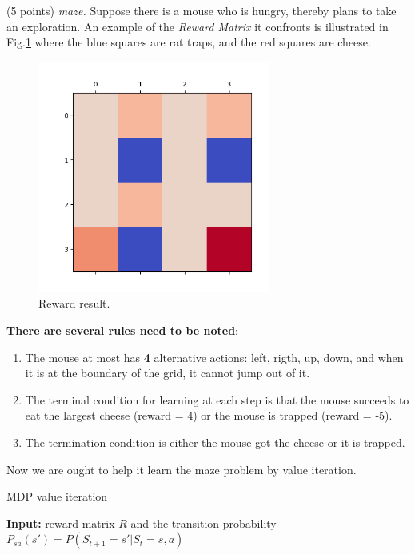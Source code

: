 \documentclass[a4paper, 12pt]{exam}
\begin{document}
	\begin{questions}
		\question (5 points) \emph{maze.} Suppose there is a mouse who is hungry, thereby plans to take an exploration. An example of the \emph{Reward Matrix} it confronts is illustrated in Fig.\ref{fig1} where the blue squares are rat traps, and the red squares are cheese. 
	\begin{figure}[htbp]
\centering
\includegraphics[width=3in]{0.png}
\caption{Reward result.}\label{fig1}
\end{figure}
 \textbf{There are several rules need to be noted}:
\begin{enumerate}[label=\roman*.]
\item The mouse at most has \textbf{4} alternative actions: left, rigth, up, down, and when it is at the boundary of the grid, it cannot jump out of it.

\item The terminal condition for learning at each step is that the mouse succeeds to eat the largest cheese (reward = 4) or the mouse is trapped (reward = -5).

\item The termination condition is either the mouse got the cheese or it is trapped.

\end{enumerate}


Now we are ought to help it learn the maze problem by value iteration.
\begin{algorithm}[H] 
\caption{MDP value iteration\label{vi}} %
\hspace*{0.02in} {\bf Input:} %
reward matrix $R$ and the transition probability $P_{sa}(s') = P(S_{t+1}=s'|S_t=s, a)$


\end{algorithm}
\end{questions}
\end{document}
